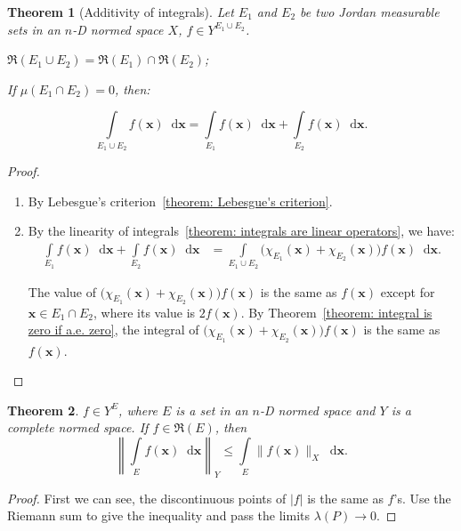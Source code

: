 \documentclass[openany]{book}
\theoremstyle{plain}
\newtheorem{theorem}{Theorem}[section] %
\theoremstyle{definition}
\newcommand{\dif}{\mathop{}\!\mathrm{d}} %
\newcommand*{\bv}{\boldsymbol} %
\begin{document}
\begin{theorem}[Additivity of integrals]
	Let $E_1$ and $E_2$ be two Jordan measurable sets in an $n$-D normed space $X$, $f \in Y^{E_1 \cup E_2}$.
	\begin{enumerate*}
		\item $\mathfrak R(E_1 \cup E_2) = \mathfrak R(E_1) \cap \mathfrak R(E_2)$;
		\item If $\mu(E_1 \cap E_2) = 0$, then:
	\end{enumerate*} 
	\begin{equation*}
		\int\limits_{E_1 \cup E_2} f(\bv x) \dif \bv x 
			= \int\limits_{E_1} f(\bv x) \dif \bv x
				+ \int\limits_{E_2} f(\bv x) \dif \bv x.
	\end{equation*}
\end{theorem}
\begin{proof}
	\begin{enumerate}
		\item By Lebesgue's criterion~\ref{theorem: Lebesgue's criterion}.
		\item By the linearity of integrals~\ref{theorem: integrals are linear operators}, we have:
		\begin{align*}
			\int\limits_{E_1} f(\bv x) \dif \bv x
				+ \int\limits_{E_2} f(\bv x) \dif \bv x 
				&= \int\limits_{E_1 \cup E_2} \big(
						\chi_{E_1}(\bv x)  + \chi_{E_2}(\bv x)
					\big) f(\bv x) \dif \bv x.
		\end{align*}

		The value of $\big(\chi_{E_1}(\bv x)  + \chi_{E_2}(\bv x)\big) f(\bv x)$ is the same as $f(\bv x)$ except for $\bv x \in E_1 \cap E_2$, where its value is $2f(\bv x)$. 
		By Theorem~\ref{theorem: integral is zero if a.e. zero}, the integral of $\big(\chi_{E_1}(\bv x)  + \chi_{E_2}(\bv x)\big) f(\bv x)$ is the same as $f(\bv x)$.
	\end{enumerate}
\end{proof}

\begin{theorem}\label{theorem: the int of abs and the abs of int}
	$f \in Y^E$, where $E$ is a set in an $n$-D normed space and $Y$ is a complete normed space. 
	If $f \in \mathfrak R(E)$, then
	\begin{equation*}
		\left\|
			\int\limits_E f(\bv x) \dif \bv x
		\right\|_Y \leq \int\limits_E \|f(\bv x)\|_X \dif \bv x.
	\end{equation*}
\end{theorem}
\begin{proof}
	First we can see, the discontinuous points of $|f|$ is the same as $f$'s.
	Use the Riemann sum to give the inequality and pass the limits $\lambda(P) \to 0$.
\end{proof}
\end{document}
